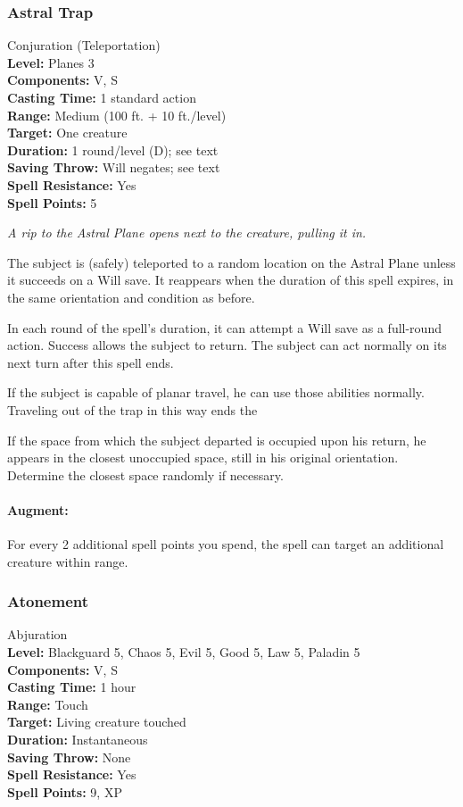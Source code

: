 \subsubsection{Astral Trap}
\label{Spell:AstralTrap}
Conjuration (Teleportation)
\\ \textbf{Level:} Planes 3
\\ \textbf{Components:} V, S
\\ \textbf{Casting Time:} 1 standard action
\\ \textbf{Range:} Medium (100 ft. + 10 ft./level)
\\ \textbf{Target:} One creature
\\ \textbf{Duration:} 1 round/level (D); see text
\\ \textbf{Saving Throw:} Will negates; see text
\\ \textbf{Spell Resistance:} Yes
\\ \textbf{Spell Points:} 5

\emph{A rip to the Astral Plane opens next to the creature, pulling it in.}

The subject is (safely) teleported to a random location on the Astral Plane unless it succeeds on a Will save.
It reappears when the duration of this spell expires, in the same orientation and condition as before.

In each round of the spell's duration, it can attempt a Will save as a full-round action. 
Success allows the subject to return. 
The subject can act normally on its next turn after this spell ends.

If the subject is capable of planar travel, he can use those abilities normally. Traveling out of the trap in this way ends the 

If the space from which the subject departed is occupied upon his return, he appears in the closest unoccupied space, still in his original orientation. Determine the closest space randomly if necessary.

\paragraph{Augment:} For every 2 additional spell points you spend, the spell can target an additional creature within range.
\subsubsection{Atonement}
\label{Spell:Atonement}
Abjuration
\\ \textbf{Level:} Blackguard 5, Chaos 5, Evil 5, Good 5, Law 5, Paladin 5
\\ \textbf{Components:} V, S
\\ \textbf{Casting Time:} 1 hour
\\ \textbf{Range:} Touch
\\ \textbf{Target:} Living creature touched
\\ \textbf{Duration:} Instantaneous
\\ \textbf{Saving Throw:} None
\\ \textbf{Spell Resistance:} Yes
\\ \textbf{Spell Points:} 9, XP

